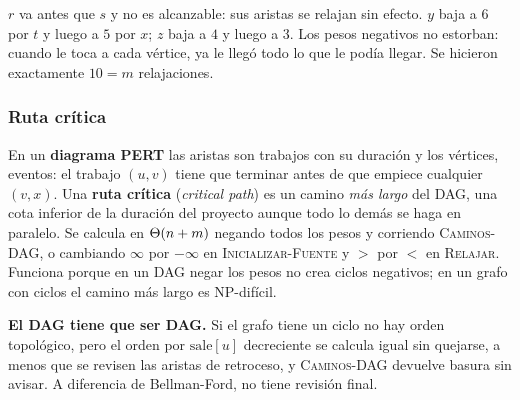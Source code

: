 \documentclass[11pt,letterpaper]{article}
\begin{document}
\begin{ejemplo}
\begin{center}
  \end{center}
  $r$ va antes que $s$ y no es alcanzable: sus aristas se relajan sin
  efecto. $y$ baja a $6$ por $t$ y luego a $5$ por $x$; $z$ baja a $4$
  y luego a $3$. Los pesos negativos no estorban: cuando le toca a
  cada vértice, ya le llegó todo lo que le podía llegar. Se hicieron
  exactamente $10 = m$ relajaciones.
\end{ejemplo}

\subsubsection*{Ruta crítica}

En un \textbf{diagrama PERT} las aristas son trabajos con su duración
y los vértices, eventos: el trabajo $(u, v)$ tiene que terminar antes
de que empiece cualquier $(v, x)$. Una \textbf{ruta crítica}
(\textit{critical path}) es un camino \emph{más largo} del DAG, una
cota inferior de la duración del proyecto aunque todo lo demás se haga
en paralelo. Se calcula en $\Theta\!\left(n + m\right)$ negando todos los pesos y
corriendo \textsc{Caminos-DAG}, o cambiando $\infty$ por $-\infty$ en
\textsc{Inicializar-Fuente} y $>$ por $<$ en \textsc{Relajar}.
Funciona porque en un DAG negar los pesos no crea ciclos negativos;
en un grafo con ciclos el camino más largo es NP-difícil.

\begin{ojo}
  \textbf{El DAG tiene que ser DAG.} Si el grafo tiene un ciclo no hay
  orden topológico, pero el orden por $\text{sale}[u]$ decreciente se
  calcula igual sin quejarse, a menos que se revisen las aristas de
  retroceso, y \textsc{Caminos-DAG} devuelve basura sin avisar. A
  diferencia de Bellman-Ford, no tiene revisión final.
\end{ojo}
\end{document}

